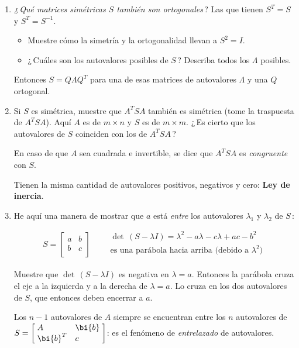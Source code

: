 \begin{enumerate}
\item \emph{¿\,Qué matrices simétricas $S$ también son ortogonales}\,? Las que tienen $S^T=S$ y $S^T=S^{-1}$.
\begin{itemize}
\item[(a)] Muestre cómo la simetría y la ortogonalidad llevan a $S^2=I$.
\item[(b)] ¿\,Cuáles son los autovalores posibles de $S$\,? Describa todos los $\Lambda$ posibles.
\end{itemize}
Entonces $S=Q\Lambda Q^T$ para una de esas matrices de autovalores $\Lambda$ y una $Q$ ortogonal.

\item Si $S$ es simétrica, muestre que $A^T SA$ también es simétrica (tome la traspuesta de $A^T SA$). Aquí $A$ es de $m \times n$ y $S$ es de $m\times m$. ¿\,Es cierto que los autovalores de $S$ coinciden con los de $A^T SA$\,?

\vspace{5pt}
\quad\; En caso de que $A$ sea cuadrada e invertible, se dice que $A^T SA$ es \emph{congruente}  con $S$.

\quad\; Tienen la misma cantidad de autovalores positivos, negativos y cero: \textbf{Ley de inercia}.

\item He aquí una manera de mostrar que $a$ está \emph{entre} los autovalores $\lambda_1$ y $\lambda_2$ de $S$\,:

\vspace{-5pt}
$$
S=\left[\begin{array}{ll}
a&b\\
b&c\\
\end{array}\right]\qquad \begin{array}{l}
\det\,(S-\lambda I)=\lambda^2-a\lambda-c\lambda+ac-b^2\\
\text{es una parábola hacia arriba (debido a $\lambda^2$)}\\
\end{array}
$$

\noindent
Muestre que $\det\,(S-\lambda I)$ es negativa en $\lambda=a$. Entonces la parábola cruza el eje a la izquierda y a la derecha de $\lambda=a$. Lo cruza en los dos autovalores de $S$, que entonces deben encerrar a $a$.

Los $n-1$ autovalores de $A$ siempre se encuentran entre los $n$ autovalores de $S=\left[\begin{array}{@{\;}ll@{\;}}
A&\bi{b}\\
\bi{b}^T&c\\
\end{array}\right]$: es el fenómeno de \emph{entrelazado} de autovalores.


\end{enumerate}
